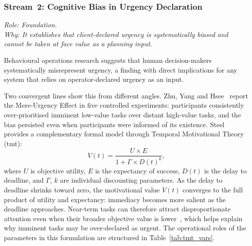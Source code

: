 \subsubsection{Stream~2: Cognitive Bias in Urgency Declaration}
\label{subsec:biases}

\noindent\textit{Role: Foundation. \\ Why: It establishes that client-declared urgency is
systematically biased and cannot be taken at face value as a planning input.}

\medskip

Behavioural operations research suggests that human decision-makers systematically
misrepresent urgency, a finding with direct implications for any system that relies on
operator-declared urgency as an input.

Two convergent lines show this from different angles. Zhu, Yang and
Hsee~\autocite{zhu2018mere} report the Mere-Urgency Effect in five controlled experiments:
participants consistently over-prioritised imminent low-value tasks over distant
high-value tasks, and the bias persisted even when participants were informed of its
existence. Steel~\autocite{steel2006integrating} provides a complementary formal model
through Temporal Motivational Theory (\gls{tmt}):
\begin{equation}
    V(t) = \frac{U \times E}{1 + \Gamma \times D(t)^k},
    \label{eq:tmt_val}
\end{equation}
where $U$ is objective utility, $E$ is the expectancy of success, $D(t)$ is the delay
to deadline, and $\Gamma$, $k$ are individual discounting parameters. As the delay to
deadline shrinks toward zero, the motivational value $V(t)$ converges to the full product
of utility and expectancy: immediacy becomes more salient as the deadline approaches.
Near-term tasks can therefore attract disproportionate attention even when their broader
objective value is lower~\autocite{steel2006integrating}, which helps explain why
imminent tasks may be over-declared as urgent. The operational roles of the parameters in this formulation are structured in Table~\ref{tab:tmt_vars}.

